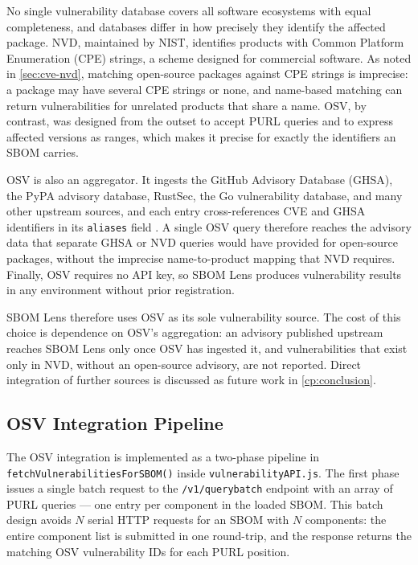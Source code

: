 No single vulnerability database covers all software ecosystems with equal completeness, and databases differ in how precisely they identify the affected package. NVD, maintained by NIST, identifies products with Common Platform Enumeration (CPE) strings, a scheme designed for commercial software. As noted in \autoref{sec:cve-nvd}, matching open-source packages against CPE strings is imprecise: a package may have several CPE strings or none, and name-based matching can return vulnerabilities for unrelated products that share a name. OSV, by contrast, was designed from the outset to accept PURL queries and to express affected versions as ranges, which makes it precise for exactly the identifiers an SBOM carries.

OSV is also an aggregator. It ingests the GitHub Advisory Database (GHSA), the PyPA advisory database, RustSec, the Go vulnerability database, and many other upstream sources, and each entry cross-references CVE and GHSA identifiers in its \texttt{aliases} field \citep{OSV}. A single OSV query therefore reaches the advisory data that separate GHSA or NVD queries would have provided for open-source packages, without the imprecise name-to-product mapping that NVD requires. Finally, OSV requires no API key, so SBOM Lens produces vulnerability results in any environment without prior registration.

SBOM Lens therefore uses OSV as its sole vulnerability source. The cost of this choice is dependence on OSV's aggregation: an advisory published upstream reaches SBOM Lens only once OSV has ingested it, and vulnerabilities that exist only in NVD, without an open-source advisory, are not reported. Direct integration of further sources is discussed as future work in \autoref{cp:conclusion}.


\subsection{OSV Integration Pipeline}
\label{sec:osv-pipeline}

The OSV integration is implemented as a two-phase pipeline in \texttt{fetchVulnerabilitiesForSBOM()} inside \texttt{vulnerabilityAPI.js}. The first phase issues a single batch request to the \texttt{/v1/querybatch} endpoint with an array of PURL queries --- one entry per component in the loaded SBOM. This batch design avoids \(N\) serial HTTP requests for an SBOM with \(N\) components: the entire component list is submitted in one round-trip, and the response returns the matching OSV vulnerability IDs for each PURL position.

